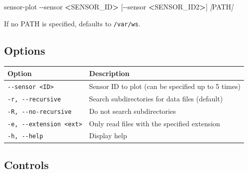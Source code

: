 \documentclass[
]{book}
\newenvironment{Shaded}{\begin{snugshade}}{\end{snugshade}}
\newcommand{\AttributeTok}[1]{\textcolor[rgb]{0.13,0.29,0.53}{#1}}
\newcommand{\ExtensionTok}[1]{#1}
\newcommand{\NormalTok}[1]{#1}
\newcommand{\OperatorTok}[1]{\textcolor[rgb]{0.81,0.36,0.00}{\textbf{#1}}}
\newcommand{\PreprocessorTok}[1]{\textcolor[rgb]{0.56,0.35,0.01}{\textit{#1}}}
\newcommand{\SpecialStringTok}[1]{\textcolor[rgb]{0.31,0.60,0.02}{#1}}
\begin{document}
\begin{Shaded}
\begin{Highlighting}[]
\ExtensionTok{sensor{-}plot} \AttributeTok{{-}{-}sensor} \OperatorTok{\textless{}}\NormalTok{SENSOR\_ID}\OperatorTok{\textgreater{}}\NormalTok{ [{-}{-}sensor }\OperatorTok{\textless{}}\NormalTok{SENSOR\_ID2}\OperatorTok{\textgreater{}}\NormalTok{] }\PreprocessorTok{[}\SpecialStringTok{PATH}\PreprocessorTok{]}
\end{Highlighting}
\end{Shaded}

If no PATH is specified, defaults to \texttt{/var/ws}.

\subsection{Options}\label{options}

{\def\LTcaptype{} %
\begin{longtable}[]{@{}
  >{\raggedright\arraybackslash}p{}
  >{\raggedright\arraybackslash}p{}@{}}
\toprule\noalign{}
\begin{minipage}[b]{\linewidth}\raggedright
Option
\end{minipage} & \begin{minipage}[b]{\linewidth}\raggedright
Description
\end{minipage} \\
\midrule\noalign{}
\endhead
\bottomrule\noalign{}
\endlastfoot
\texttt{-\/-sensor\ \textless{}ID\textgreater{}} & Sensor ID to plot (can be specified up to 5 times) \\
\texttt{-r,\ -\/-recursive} & Search subdirectories for data files (default) \\
\texttt{-R,\ -\/-no-recursive} & Do not search subdirectories \\
\texttt{-e,\ -\/-extension\ \textless{}ext\textgreater{}} & Only read files with the specified extension \\
\texttt{-h,\ -\/-help} & Display help \\
\end{longtable}
}

\subsection{Controls}\label{controls-1}
\end{document}
